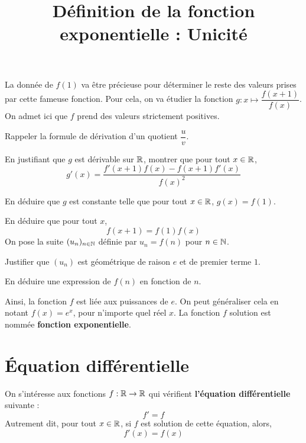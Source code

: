 \documentclass{exos}
\begin{document}
\begin{alphaquestions}
La donnée de $f(1)$ va être précieuse pour déterminer le reste des valeurs prises par cette fameuse fonction. Pour cela, on va étudier la fonction $g : x \mapsto \dfrac{f(x + 1)}{f(x)}$. On admet ici que $f$ prend des valeurs strictement positives.

\item Rappeler la formule de dérivation d'un quotient $\dfrac{u}{v}$.
\item En justifiant que $g$ est dérivable sur $\mathbb{R}$, montrer que pour tout $x \in \mathbb{R}$,
\begin{equation*}
g'(x) = \dfrac{f'(x + 1)f(x) - f(x+1)f'(x)}{f(x)^2}
\end{equation*}
\item En déduire que $g$ est constante telle que pour tout $x \in \mathbb{R}$, $g(x) = f(1)$.
\item En déduire que pour tout $x$,
\begin{equation*}
f(x+1) = f(1)f(x)
\end{equation*}
On pose la suite $(u_n)_{n \in \mathbb{N}}$ définie par $u_n = f(n)$ pour $n \in \mathbb{N}$.
\item Justifier que $(u_n)$ est géométrique de raison $e$ et de premier terme $1$.
\item En déduire une expression de $f(n)$ en fonction de $n$.

Ainsi, la fonction $f$ est liée aux puissances de $e$. On peut généraliser cela en notant $f(x)=e^x$, pour n'importe quel réel $x$. La fonction $f$ solution est nommée \textbf{fonction exponentielle}.

\end{alphaquestions}
\newpage
\title{Définition de la fonction exponentielle : Unicité}
\maketitle
\section{Équation différentielle}
On s'intéresse aux fonctions $f : \mathbb{R} \to \mathbb{R}$ qui vérifient \textbf{l'équation différentielle} suivante :
\begin{equation*}
f' = f
\end{equation*}
Autrement dit, pour tout $x \in \mathbb{R}$, si $f$ est solution de cette équation, alors,
\begin{equation*}
f'(x) = f(x)
\end{equation*}
\end{document}
